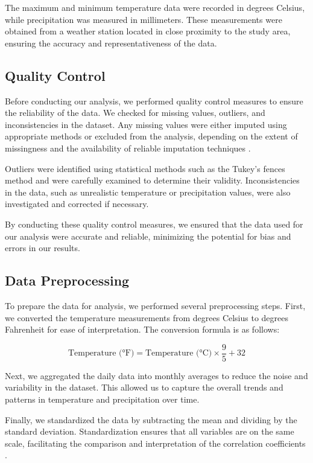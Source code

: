 \documentclass{article}
\begin{document}
The maximum and minimum temperature data were recorded in degrees Celsius, while precipitation was measured in millimeters. These measurements were obtained from a weather station located in close proximity to the study area, ensuring the accuracy and representativeness of the data.

\subsection{Quality Control}

Before conducting our analysis, we performed quality control measures to ensure the reliability of the data. We checked for missing values, outliers, and inconsistencies in the dataset. Any missing values were either imputed using appropriate methods or excluded from the analysis, depending on the extent of missingness and the availability of reliable imputation techniques \cite{rubin1976inference}.

Outliers were identified using statistical methods such as the Tukey's fences method \cite{tukey1977exploratory} and were carefully examined to determine their validity. Inconsistencies in the data, such as unrealistic temperature or precipitation values, were also investigated and corrected if necessary.

By conducting these quality control measures, we ensured that the data used for our analysis were accurate and reliable, minimizing the potential for bias and errors in our results.

\subsection{Data Preprocessing}

To prepare the data for analysis, we performed several preprocessing steps. First, we converted the temperature measurements from degrees Celsius to degrees Fahrenheit for ease of interpretation. The conversion formula is as follows:

\begin{equation}
\text{{Temperature (°F)}} = \text{{Temperature (°C)}} \times \frac{9}{5} + 32
\end{equation}

Next, we aggregated the daily data into monthly averages to reduce the noise and variability in the dataset. This allowed us to capture the overall trends and patterns in temperature and precipitation over time.

Finally, we standardized the data by subtracting the mean and dividing by the standard deviation. Standardization ensures that all variables are on the same scale, facilitating the comparison and interpretation of the correlation coefficients \cite{hair2010multivariate}.
\end{document}
